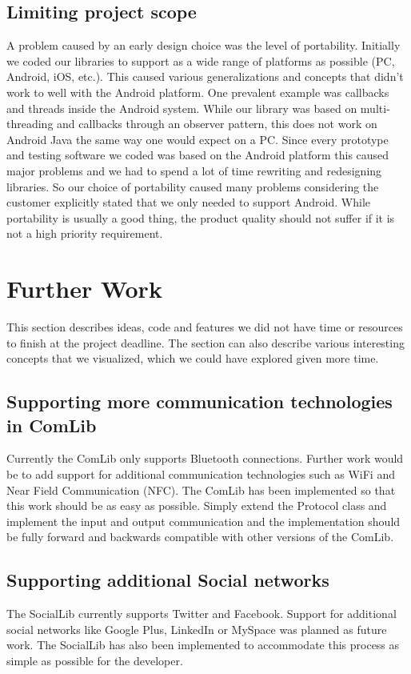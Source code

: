 \subsection{Limiting project scope}
A problem caused by an early design choice was the level of portability. Initially we coded our libraries to support as a wide range of platforms as possible (PC, Android, iOS, etc.). This caused various generalizations and concepts that didn't work to well with the Android platform. One prevalent example was callbacks and threads inside the Android system. While our library was based on multi-threading and callbacks through an observer pattern, this does not work on Android Java the same way one would expect on a PC. Since every prototype and testing software we coded was based on the Android platform this caused major problems and we had to spend a lot of time rewriting and redesigning libraries. So our choice of portability caused many problems considering the customer explicitly stated that we only needed to support Android. While portability is usually a good thing, the product quality should not suffer if it is not a high priority requirement.

\section{Further Work}
This section describes ideas, code and features we did not have time or resources to
finish at the project deadline. The section can also describe various interesting concepts 
that we visualized, which we could have explored given more time.

\subsection{Supporting more communication technologies in ComLib}
Currently the ComLib only supports Bluetooth connections. Further work would be
to add support for additional communication technologies such as WiFi and Near Field 
Communication (NFC). The ComLib has been implemented so that this work should
be as easy as possible. Simply extend the Protocol class and implement the input and
output communication and the implementation should be fully forward and backwards
compatible with other versions of the ComLib.

\subsection{Supporting additional Social networks}
The SocialLib currently supports Twitter and Facebook. Support for additional social
networks like Google Plus, LinkedIn or MySpace was planned as future work. The
SocialLib has also been implemented to accommodate this process as simple as possible
for the developer.

